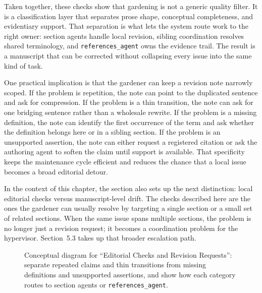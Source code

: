 Taken together, these checks show that gardening is not a generic quality filter. It is a classification layer that separates prose shape, conceptual completeness, and evidentiary support. That separation is what lets the system route work to the right owner: section agents handle local revision, sibling coordination resolves shared terminology, and \texttt{references\_agent} owns the evidence trail. The result is a manuscript that can be corrected without collapsing every issue into the same kind of task.

One practical implication is that the gardener can keep a revision note narrowly scoped. If the problem is repetition, the note can point to the duplicated sentence and ask for compression. If the problem is a thin transition, the note can ask for one bridging sentence rather than a wholesale rewrite. If the problem is a missing definition, the note can identify the first occurrence of the term and ask whether the definition belongs here or in a sibling section. If the problem is an unsupported assertion, the note can either request a registered citation or ask the authoring agent to soften the claim until support is available. That specificity keeps the maintenance cycle efficient and reduces the chance that a local issue becomes a broad editorial detour.

In the context of this chapter, the section also sets up the next distinction: local editorial checks versus manuscript-level drift. The checks described here are the ones the gardener can usually resolve by targeting a single section or a small set of related sections. When the same issue spans multiple sections, the problem is no longer just a revision request; it becomes a coordination problem for the hypervisor. Section~5.3 takes up that broader escalation path.

\begin{figure}[htbp]
\centering

\caption{Conceptual diagram for ``Editorial Checks and Revision Requests'': separate repeated claims and thin transitions from missing definitions and unsupported assertions, and show how each category routes to section agents or \texttt{references\_agent}.}
\end{figure}
